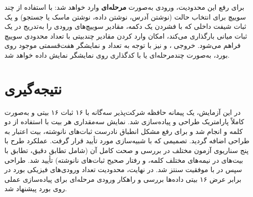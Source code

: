 \documentclass[11pt,a4paper]{article}
\begin{document}
برای رفع این محدودیت، ورودی به‌صورت \textbf{مرحله‌ای} وارد
خواهد شد: با استفاده از چند سوییچ برای انتخاب حالت (نوشتن آدرس، نوشتن
داده، نوشتن ماسک یا جستجو) و یک ثبات شیفت داخلی که با فشردن یک دکمه،
مقادیر سوییچ‌های ورودی را به‌تدریج در یک ثبات میانی بارگذاری می‌کند، امکان
وارد کردن مقادیر چندبیتی با تعداد محدودی سوییچ فراهم می‌شود. خروجی
،  و 
نیز با توجه به تعداد  و نمایشگر هفت‌قسمتی موجود روی بورد، به‌صورت
چندمرحله‌ای یا با کدگذاری  روی نمایشگر نمایش داده خواهد شد.

\section{نتیجه‌گیری}
در این آزمایش، یک پیمانه حافظه شرکت‌پذیر سه‌گانه  با ۱۶ ثبات
۱۶ بیتی و به‌صورت کاملاً پارامتریک طراحی و پیاده‌سازی شد. نمایش سه‌مقداری
هر بیت با استفاده از دو کلمه  و  انجام شد و برای رفع
مشکل انطباق نادرست ثبات‌های نانوشته، بیت اعتبار  به طراحی
اضافه گردید. تصمیمی که با شبیه‌سازی مورد تأیید قرار گرفت. عملکرد طرح با
پنج سناریوی آزمون مختلف در  بررسی و صحت کامل آن (شامل تطابق
دقیق، تطابق با بیت‌های  در نیمه‌های مختلف کلمه، و رفتار صحیح ثبات‌های
نانوشته) تأیید شد. طراحی سپس در  با موفقیت سنتز شد. در نهایت،
محدودیت تعداد ورودی‌های فیزیکی بورد در برابر عرض ۱۶ بیتی داده‌ها بررسی و
راهکار ورودی مرحله‌ای برای پیاده‌سازی عملی روی بورد پیشنهاد شد.
\end{document}
